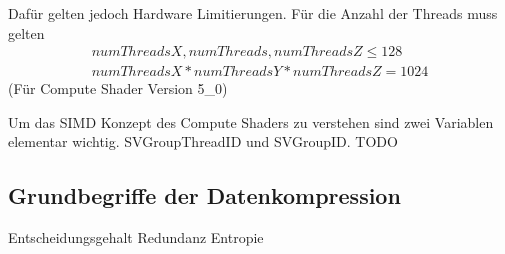 Dafür gelten jedoch Hardware Limitierungen.
Für die Anzahl der Threads muss gelten
\begin{gather*}
	numThreadsX, numThreads, numThreadsZ \leq 128 \\
	numThreadsX * numThreadsY * numThreadsZ = 1024
\end{gather*}
(Für Compute Shader Version 5\_0)

Um das SIMD Konzept des Compute Shaders zu verstehen sind zwei Variablen elementar wichtig.
SVGroupThreadID und SVGroupID.
TODO

\subsection{Grundbegriffe der Datenkompression}
\label{subsec:grundbegriffe_datenkompression}

Entscheidungsgehalt
Redundanz
Entropie
